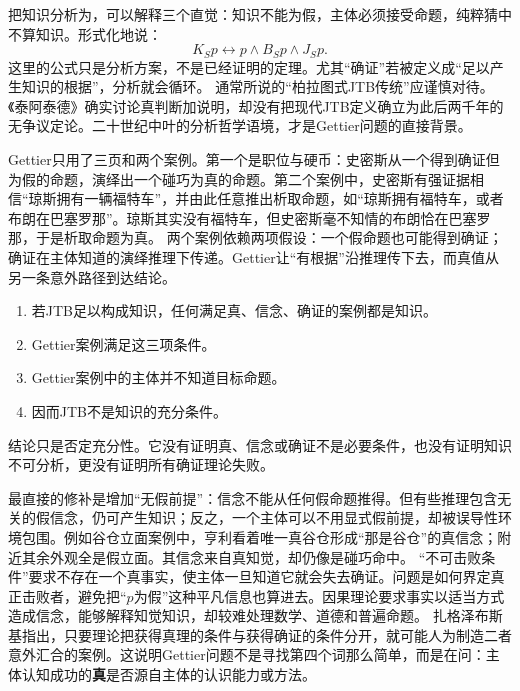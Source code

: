 把知识分析为，可以解释三个直觉：知识不能为假，主体必须接受命题，纯粹猜中不算知识。形式化地说：
\[
K_Sp \leftrightarrow p \land B_Sp \land J_Sp .
\]
这里的公式只是分析方案，不是已经证明的定理。尤其“确证”若被定义成“足以产生知识的根据”，分析就会循环。 通常所说的“柏拉图式JTB传统”应谨慎对待。《泰阿泰德》确实讨论真判断加说明，却没有把现代JTB定义确立为此后两千年的无争议定论\parencite[201c--210b]{plato1990}。二十世纪中叶的分析哲学语境，才是Gettier问题的直接背景。

Gettier只用了三页和两个案例\parencite[121--123]{gettier1963}。第一个是职位与硬币：史密斯从一个得到确证但为假的命题，演绎出一个碰巧为真的命题。第二个案例中，史密斯有强证据相信“琼斯拥有一辆福特车”，并由此任意推出析取命题，如“琼斯拥有福特车，或者布朗在巴塞罗那”。琼斯其实没有福特车，但史密斯毫不知情的布朗恰在巴塞罗那，于是析取命题为真。 两个案例依赖两项假设：一个假命题也可能得到确证；确证在主体知道的演绎推理下传递。Gettier让“有根据”沿推理传下去，而真值从另一条意外路径到达结论。

\begin{argumentbox}
\begin{enumerate}
  \item 若JTB足以构成知识，任何满足真、信念、确证的案例都是知识。
  \item Gettier案例满足这三项条件。
  \item Gettier案例中的主体并不知道目标命题。
  \item 因而JTB不是知识的充分条件。
\end{enumerate}
\end{argumentbox}

结论只是否定充分性。它没有证明真、信念或确证不是必要条件，也没有证明知识不可分析，更没有证明所有确证理论失败。

最直接的修补是增加“无假前提”：信念不能从任何假命题推得。但有些推理包含无关的假信念，仍可产生知识；反之，一个主体可以不用显式假前提，却被误导性环境包围。例如谷仓立面案例中，亨利看着唯一真谷仓形成“那是谷仓”的真信念；附近其余外观全是假立面。其信念来自真知觉，却仍像是碰巧命中。 “不可击败条件”要求不存在一个真事实，使主体一旦知道它就会失去确证。问题是如何界定真正击败者，避免把“$p$为假”这种平凡信息也算进去。因果理论要求事实以适当方式造成信念\parencite{goldman1967}，能够解释知觉知识，却较难处理数学、道德和普遍命题。 扎格泽布斯基指出，只要理论把获得真理的条件与获得确证的条件分开，就可能人为制造二者意外汇合的案例\parencite{zagzebski1994}。这说明Gettier问题不是寻找第四个词那么简单，而是在问：主体认知成功的\textbf{真}是否源自主体的认识能力或方法。

